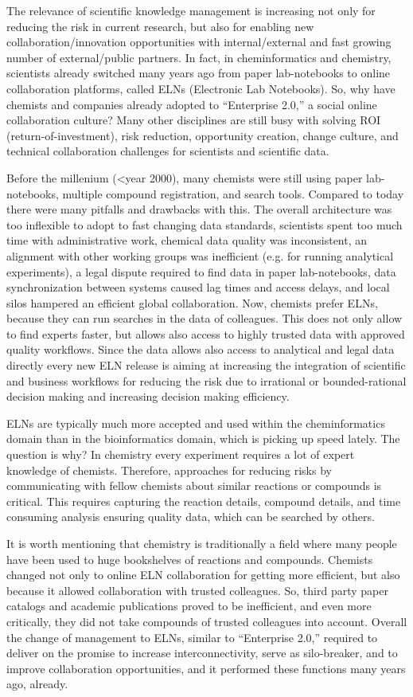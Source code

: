 \documentclass{sig-alternate}
\begin{document}
The relevance of scientific knowledge management is increasing not only for
reducing the risk in current research, but also for enabling new
collaboration/innovation opportunities with internal/external and fast growing
number of external/public partners. In fact, in cheminformatics and chemistry,
scientists already switched many years ago from paper lab-notebooks to
online collaboration platforms, called ELNs (Electronic Lab Notebooks). So, why
have chemists and companies already adopted to ``Enterprise 2.0,'' a social
online collaboration culture? Many other disciplines are still busy with solving
ROI (return-of-investment), risk reduction, opportunity creation, change
culture, and technical collaboration challenges for scientists and scientific
data.

Before the millenium (<year 2000), many chemists were still using paper
lab-notebooks, multiple compound registration, and search tools. Compared to
today there were many pitfalls and drawbacks with this. The overall architecture
was too inflexible to adopt to fast changing data standards, scientists spent
too much time with administrative work, chemical data quality was inconsistent,
an alignment with other working groups was inefficient (e.g. for running
analytical experiments), a legal dispute required to find data in paper
lab-notebooks, data synchronization between systems caused lag times and access
delays, and local silos hampered an efficient global collaboration. Now,
chemists prefer ELNs, because they can run searches in the data of colleagues. This does
not only allow to find experts faster, but allows also access to highly trusted
data with approved quality workflows. Since the data allows also access to
analytical and legal data directly every new ELN release is aiming at increasing
the integration of scientific and business workflows for reducing the risk due
to irrational or bounded-rational decision making and increasing decision making
efficiency.

ELNs are typically much more accepted and used within the cheminformatics
domain than in the bioinformatics domain, which is picking up speed lately. The
question is why? In chemistry every experiment requires a lot of expert
knowledge of chemists. Therefore, approaches for reducing risks by communicating
with fellow chemists about similar reactions or compounds is critical. This
requires capturing the reaction details, compound details, and time consuming
analysis ensuring quality data, which can be searched by others.

It is worth mentioning that chemistry is traditionally a field where many people
have been used to huge bookshelves of reactions and compounds. Chemists changed
not only to online ELN collaboration for getting more efficient, but also
because it allowed collaboration with trusted colleagues. So, third party paper
catalogs and academic publications proved to be
inefficient, and even more critically, they did not take compounds of trusted
colleagues into account. Overall the change of management to ELNs, similar to
``Enterprise 2.0,'' required to deliver on the promise to increase
interconnectivity, serve as silo-breaker, and to improve collaboration
opportunities, and it performed these functions many years ago, already.
\end{document}
